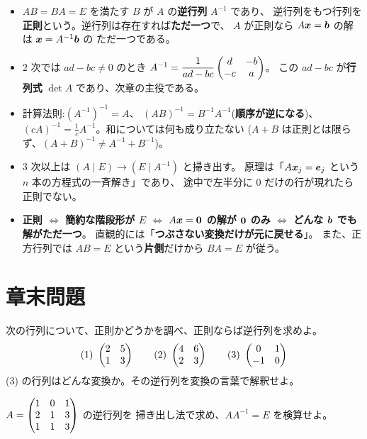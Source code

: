\begin{matome}
\begin{itemize}
\item $AB = BA = E$ を満たす $B$ が $A$ の\textbf{逆行列} $A^{-1}$ であり、
逆行列をもつ行列を\textbf{正則}という。逆行列は存在すれば\textbf{ただ一つ}で、
$A$ が正則なら $A\bm{x} = \bm{b}$ の解は $\bm{x} = A^{-1}\bm{b}$ の
ただ一つである。
\item $2$ 次では $ad - bc \neq 0$ のとき
$A^{-1} = \dfrac{1}{ad - bc}\begin{pmatrix}d & -b \\ -c & a\end{pmatrix}$。
この $ad - bc$ が\textbf{行列式} $\det A$ であり、次章の主役である。
\item 計算法則:$(A^{-1})^{-1} = A$、
$(AB)^{-1} = B^{-1}A^{-1}$(\textbf{順序が逆になる})、
$(cA)^{-1} = \frac{1}{c}A^{-1}$。和については何も成り立たない
($A + B$ は正則とは限らず、$(A+B)^{-1} \neq A^{-1} + B^{-1}$)。
\item $3$ 次以上は $(A \mid E) \to (E \mid A^{-1})$ と掃き出す。
原理は「$A\bm{x}_j = \bm{e}_j$ という $n$ 本の方程式の一斉解き」であり、
途中で左半分に $0$ だけの行が現れたら正則でない。
\item \textbf{正則 $\Leftrightarrow$ 簡約な階段形が $E$
$\Leftrightarrow$ $A\bm{x} = \bm{0}$ の解が $\bm{0}$ のみ
$\Leftrightarrow$ どんな $\bm{b}$ でも解がただ一つ}。
直観的には「\textbf{つぶさない変換だけが元に戻せる}」。
また、正方行列では $AB = E$ という\textbf{片側}だけから $BA = E$ が従う。
\end{itemize}
\end{matome}

\section*{章末問題}

\begin{mondai}[基本]\label{q:inv-ex1}
次の行列について、正則かどうかを調べ、正則ならば逆行列を求めよ。
\[
(1)\ \begin{pmatrix}2 & 5 \\ 1 & 3\end{pmatrix} \qquad
(2)\ \begin{pmatrix}4 & 6 \\ 2 & 3\end{pmatrix} \qquad
(3)\ \begin{pmatrix}0 & 1 \\ -1 & 0\end{pmatrix}
\]
(3) の行列はどんな変換か。その逆行列を変換の言葉で解釈せよ。
\end{mondai}

\begin{mondai}[基本]\label{q:inv-ex2}
$A = \begin{pmatrix}1 & 0 & 1 \\ 2 & 1 & 3 \\ 1 & 1 & 3\end{pmatrix}$ の逆行列を
掃き出し法で求め、$AA^{-1} = E$ を検算せよ。
\end{mondai}

